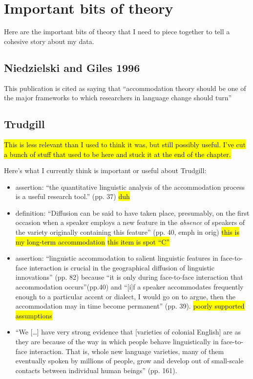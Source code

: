\section{Important bits of theory}
\label{sec:theory}
Here are the important bits of theory that I need to piece together to tell a cohesive story about my data.

\subsection{Niedzielski and Giles 1996}
This publication is cited as saying that ``accommodation theory should be one of the major frameworks to which researchers in language change should turn'' \citep[p.335]{auer2005role}


\subsection{Trudgill}
\hl{This is less relevant than I used to think it was, but still possibly useful. I've cut a bunch of stuff that used to be here and stuck it at the end of the chapter.}

Here's what I currently think is important or useful about Trudgill:

\begin{itemize}
    \item assertion: ``the quantitative linguistic analysis of the accommodation process is a useful research tool.'' (pp. 37) \hl{duh}
    \item definition:  ``Diffusion can be said to have taken place, presumably, on the first occasion when a speaker employs a new feature in the \emph{absence} of speakers of the variety originally containing this feature'' (pp. 40, emph in orig) \hl{this is my long-term accommodation} \hl{this item is spot ``C''}
    \item assertion: ``linguistic accommodation to salient linguistic features in face-to-face interaction is crucial in the geographical diffusion of linguistic innovations'' (pp. 82) because ``it is only during face-to-face interaction that accommodation occurs''(pp.40) and ``[i]f a speaker accommodates frequently enough to a particular accent or dialect, I would go on to argue, then the accommodation may in time become permanent'' (pp. 39). \hl{poorly supported assumptions}
    \item ``We [\ldots{}] have very strong evidence that [varieties of colonial English] are as they are because of the way in which people behave linguistically in face-to-face interaction. That is, whole new language varieties, many of them eventually spoken by millions of people, grow and develop out of small-scale contacts between individual human beings'' (pp. 161). 
\end{itemize}

